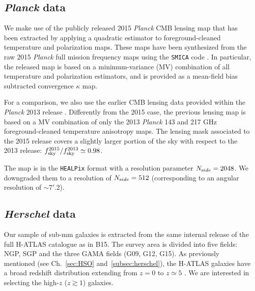 \subsection{\emph{Planck} data}
\label{subsec:planck}
We make use of the publicly released 2015 \emph{Planck} CMB lensing map \citep{PlanckCollaboration2015} that has been extracted by applying a quadratic estimator \citep{Okamoto2003} to
foreground-cleaned temperature and polarization maps. These maps have been synthesized from the raw 2015 \emph{Planck} full mission frequency maps using the \texttt{SMICA} code \citep{PlanckCollaboration2015}. In particular, the released map is based on a minimum-variance (MV) combination of all temperature and polarization estimators, and is provided as a mean-field bias subtracted convergence $\kappa$ map.

For a comparison, we also use the earlier CMB lensing data provided within the \emph{Planck} 2013 release \citep{Ade2014c}. Differently from the 2015 case, the previous lensing map is
based on a MV combination of only the 2013 \emph{Planck} 143 and 217 GHz  foreground-cleaned temperature anisotropy maps. The lensing mask associated to the 2015 release covers a slightly larger portion of the sky with respect to the 2013 release: $f_{\rm{sky}}^{2015}/f_{\rm{sky}}^{2013}\simeq0.98$.

The map is in the \lstinline!HEALPix! format with a resolution parameter $N_{\rm side} =
2048$. We downgraded them to a resolution of $N_{\rm side}=512$ (corresponding to an angular resolution of $\sim 7'.2$).

\subsection{\textit{Herschel} data} \label{subsec:herschelxc2}

Our sample of sub-mm galaxies is extracted from the same internal release of the full H-ATLAS catalogue as in B15. The survey area is divided into five fields: NGP, SGP and the three GAMA fields (G09, G12, G15).  As previously mentioned (see Ch.~\eqref{sec:HSO} and~\eqref{subsec:herschel}), the H-ATLAS galaxies have a broad redshift distribution extending from $z=0$ to $z\simeq 5$ \citep{Pearson2013}. We are interested in selecting the high-$z$ ($z \gtrsim 1$) galaxies. 

